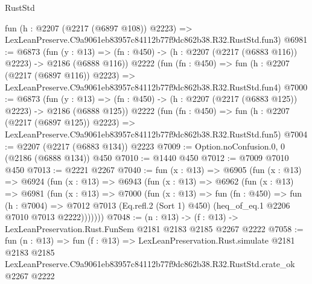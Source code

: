 \begin{lexlean}{RustStd}
\begin{coremodule}
    fun (h : @2207 (@2217 (@6897 @108)) @2223) =>
    LexLeanPreserve.C9a9061eb83957c84112b77f9dc862b38.R32.RustStd.fun3)
@6981 := @6873
    (fun (y : @13) => (fn : @450) -> (h : @2207 (@2217 (@6883 @116)) @2223) -> @2186 (@6888 @116))
    @2222
    (fun (fn : @450) =>
    fun (h : @2207 (@2217 (@6897 @116)) @2223) =>
    LexLeanPreserve.C9a9061eb83957c84112b77f9dc862b38.R32.RustStd.fun4)
@7000 := @6873
    (fun (y : @13) => (fn : @450) -> (h : @2207 (@2217 (@6883 @125)) @2223) -> @2186 (@6888 @125))
    @2222
    (fun (fn : @450) =>
    fun (h : @2207 (@2217 (@6897 @125)) @2223) =>
    LexLeanPreserve.C9a9061eb83957c84112b77f9dc862b38.R32.RustStd.fun5)
@7004 := @2207 (@2217 (@6883 @134)) @2223
@7009 := Option.noConfusion.{0, 0} (@2186 (@6888 @134)) @450
@7010 := @1440 @450
@7012 := @7009 @7010 @450
@7013 := @2221 @2267
@7040 := fun (x : @13) =>
  @6905
    (fun (x : @13) =>
    @6924
      (fun (x : @13) =>
      @6943
        (fun (x : @13) =>
        @6962
          (fun (x : @13) =>
          @6981
            (fun (x : @13) =>
            @7000
              (fun (x : @13) =>
              fun (fn : @450) =>
              fun (h : @7004) =>
              @7012 @7013 (Eq.refl.{2} (Sort 1) @450) (heq_of_eq.{1} @2206 @7010 @7013 @2222)))))))
@7048 := (n : @13) -> (f : @13) -> LexLeanPreservation.Rust.FunSem @2181 @2183 @2185 @2267 @2222
@7058 := fun (n : @13) =>
  fun (f : @13) =>
  LexLeanPreservation.Rust.simulate
    @2181
    @2183
    @2185
    LexLeanPreserve.C9a9061eb83957c84112b77f9dc862b38.R32.RustStd.crate_ok
    @2267
    @2222
\end{coremodule}
\end{lexlean}
